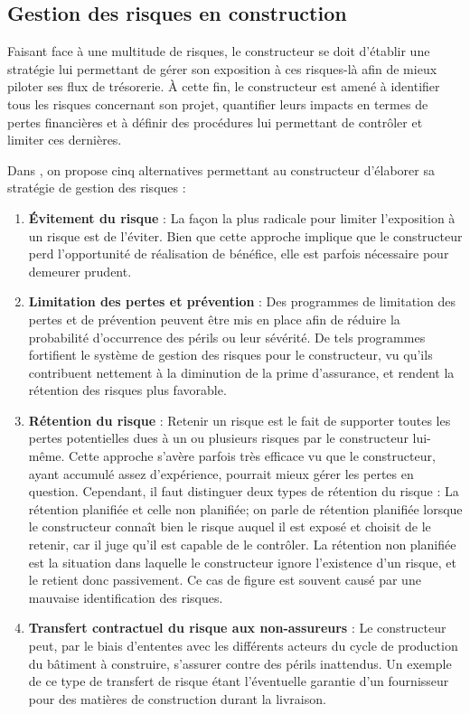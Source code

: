 \documentclass[11pt]{article}
\begin{document}
\subsection{Gestion des risques en construction}

Faisant face à une multitude de risques, le constructeur se doit d'établir une stratégie lui permettant de gérer son exposition à ces risques-là afin de mieux piloter ses flux de trésorerie. À cette fin, le constructeur est amené à identifier tous les risques concernant son projet, quantifier leurs impacts en termes de pertes financières et à définir des procédures lui permettant de contrôler et limiter ces dernières.

Dans \cite{al1990systematic}, on propose cinq alternatives permettant au constructeur d'élaborer sa stratégie de gestion des risques :
\begin{enumerate}
\item \textbf{Évitement du risque} : La façon la plus radicale pour limiter l'exposition à un risque est de l'éviter. Bien que cette approche implique que le constructeur perd l'opportunité de réalisation de bénéfice, elle est parfois nécessaire pour demeurer prudent.
\item \textbf{Limitation des pertes et prévention} : Des programmes de limitation des pertes et de prévention peuvent être mis en place afin de réduire la probabilité d'occurrence des périls ou leur sévérité. De tels programmes fortifient le système de gestion des risques pour le constructeur, vu qu'ils contribuent nettement à la diminution de la prime d'assurance, et rendent la rétention des risques plus favorable.
\item \textbf{Rétention du risque} : Retenir un risque est le fait de supporter toutes les pertes potentielles dues à un ou plusieurs risques par le constructeur lui-même. Cette approche s'avère parfois très efficace vu que le constructeur, ayant accumulé assez d'expérience, pourrait mieux gérer les pertes en question. Cependant, il faut distinguer deux types de rétention du risque : La rétention planifiée et celle non planifiée; on parle de rétention planifiée lorsque le constructeur connaît bien le risque auquel il est exposé et choisit de le retenir, car il juge qu'il est capable de le contrôler. La rétention non planifiée est la situation dans laquelle le constructeur ignore l'existence d'un risque, et le retient donc passivement. Ce cas de figure est souvent causé par une mauvaise identification des risques.
\item \textbf{Transfert contractuel du risque aux non-assureurs} : Le constructeur peut, par le biais d'ententes avec les différents acteurs du cycle de production du bâtiment à construire, s'assurer contre des périls inattendus. Un exemple de ce type de transfert de risque étant l'éventuelle garantie d'un fournisseur pour des matières de construction durant la livraison.    

\end{enumerate}
\end{document}
